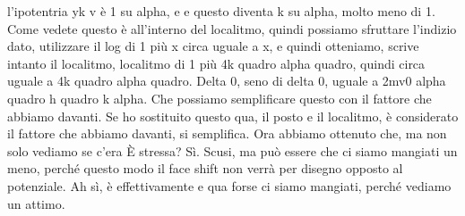 \begin{soluzione}
{l'ipotentria yk v è 1 su alpha, e e questo diventa k su alpha, molto meno di 1. Come vedete questo è all'interno del localitmo, quindi possiamo sfruttare l'indizio dato, utilizzare il log di 1 più x circa uguale a x, e quindi otteniamo, scrive intanto il localitmo, localitmo di 1 più 4k quadro alpha quadro, quindi circa uguale a 4k quadro alpha quadro. Delta 0, seno di delta 0, uguale a 2mv0 alpha quadro h quadro k alpha. Che possiamo semplificare questo con il fattore che abbiamo davanti. Se ho sostituito questo qua, il posto e il localitmo, è considerato il fattore che abbiamo davanti, si semplifica. Ora abbiamo ottenuto che, ma non solo vediamo se c'era È stressa? Sì. Scusi, ma può essere che ci siamo mangiati un meno, perché questo modo il face shift non verrà per disegno opposto al potenziale. Ah sì, è effettivamente e qua forse ci siamo mangiati, perché vediamo un attimo. 
   
}
\end{soluzione}
